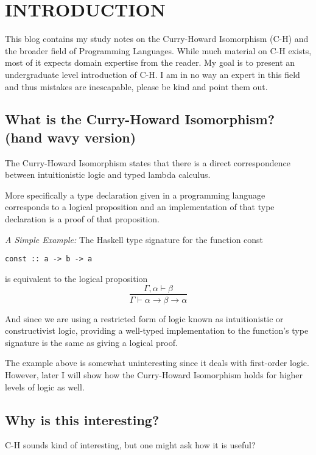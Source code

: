 \chapter{INTRODUCTION}\label{ch:intro}
This blog contains my study notes on the Curry-Howard Isomorphism (C-H) and the broader field of Programming Languages. While much material on C-H exists, most of it expects domain expertise from the reader. My goal is to present an undergraduate level introduction of C-H. I am in no way an expert in this field and thus mistakes are inescapable, please be kind and point them out.


\section{What is the Curry-Howard Isomorphism? (hand wavy version)}
The Curry-Howard Isomorphism states that there is a direct correspondence between intuitionistic logic and typed lambda calculus.

More specifically a type declaration given in a programming language corresponds to a logical proposition and an implementation of that type declaration is a proof of that proposition.

\emph{A Simple Example:}
The Haskell type signature for the function const
\begin{verbatim}
const :: a -> b -> a
\end{verbatim}

is equivalent to the logical proposition
\begin{equation*}
\frac{\Gamma, \alpha \vdash \beta}{\Gamma \vdash \alpha \rightarrow \beta \rightarrow \alpha}
\end{equation*}

And since we are using a restricted form of logic known as intuitionistic or constructivist logic, providing a well-typed implementation to the function's type signature is the same as giving a logical proof.

The example above is somewhat uninteresting since it deals with first-order logic. However, later I will show how the Curry-Howard Isomorphism holds for higher levels of logic as well.

\section{Why is this interesting?}
C-H sounds kind of interesting, but one might ask how it is useful?

